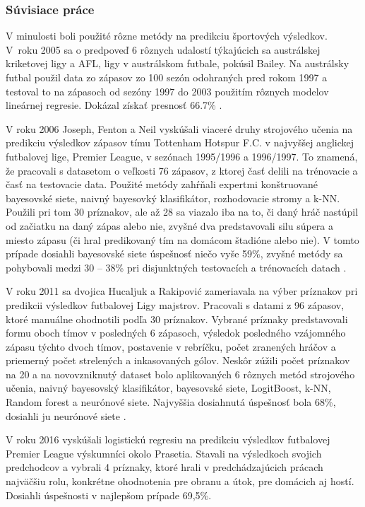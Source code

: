 \subsubsection{Súvisiace práce}

V minulosti boli použité rôzne metódy na predikciu športových výsledkov.
V~roku 2005 sa o predpoveď 6 rôznych udalostí týkajúcich sa austrálskej kriketovej ligy a AFL, ligy v austrálskom futbale, pokúsil Bailey. 
Na austrálsky futbal použil data zo zápasov zo 100 sezón odohraných pred rokom 1997 a testoval to na zápasoch od sezóny 1997 do 2003 použitím rôznych modelov lineárnej regresie. 
Dokázal získať presnosť 66.7\% \citep{related:bailey}.

V roku 2006 Joseph, Fenton a Neil vyskúšali viaceré druhy strojového učenia na predikciu výsledkov zápasov tímu Tottenham Hotspur F.C. v najvyššej anglickej futbalovej lige, Premier League, v sezónach 1995/1996 a 1996/1997.
To znamená, že pracovali s datasetom o veľkosti 76 zápasov, z ktorej časť delili na trénovacie a časť na testovacie data. 
Použité metódy zahŕňali expertmi konštruované bayesovské siete, naivný bayesovký klasifikátor, rozhodovacie stromy a k-NN. 
Použili pri tom 30 príznakov, ale až 28 sa viazalo iba na to, či daný hráč nastúpil od začiatku na daný zápas alebo nie, zvyšné dva predstavovali silu súpera a miesto zápasu (či hral predikovaný tím na domácom štadióne alebo nie).
V tomto prípade dosiahli bayesovské siete úspešnosť niečo vyše 59\%, zvyšné metódy sa pohybovali medzi 30 -- 38\% pri disjunktných testovacích a trénovacích datach  \citep{related:joseph}.

V roku 2011 sa dvojica Hucaljuk a Rakipovi{\'c} zameriavala na výber príznakov pri predikcii výsledkov futbalovej Ligy majstrov. 
Pracovali s datami z 96 zápasov, ktoré manuálne ohodnotili podľa 30 príznakov.
Vybrané príznaky predstavovali formu oboch tímov v posledných 6 zápasoch, výsledok posledného vzájomného zápasu týchto dvoch tímov, postavenie v rebríčku, počet zranených hráčov a priemerný počet strelených a inkasovaných gólov.
Neskôr zúžili počet príznakov na 20 a na novovzniknutý dataset bolo aplikovaných 6 rôznych metód strojového učenia, naivný bayesovský klasifikátor, bayesovské siete, LogitBoost, k-NN, Random forest a neurónové siete. Najvyššia dosiahnutá úspešnosť bola 68\%, dosiahli ju neurónové siete \citep{related:hucaljuk}.

V roku 2016 vyskúšali logistickú regresiu na predikciu výsledkov futbalovej Premier League výskumníci okolo Prasetia. 
Stavali na výsledkoch svojich predchodcov a vybrali 4 príznaky, ktoré hrali v predchádzajúcich prácach najväčšiu rolu, konkrétne ohodnotenia pre obranu a útok, pre domácich aj hostí.
Dosiahli úspešnosti v najlepšom prípade 69,5\%.\citep{related:prasetio}

